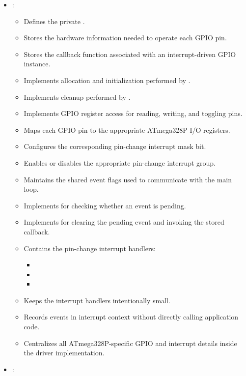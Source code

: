 \begin{itemize}
\begin{itemize}
  \end{itemize}
  \item {}:
  \begin{itemize}
    \item Defines the private .
    \item Stores the hardware information needed to operate each GPIO pin.
    \item Stores the callback function associated with an interrupt-driven GPIO instance.
    \item Implements allocation and initialization performed by .
    \item Implements cleanup performed by .
    \item Implements GPIO register access for reading, writing, and toggling pins.
    \item Maps each GPIO pin to the appropriate ATmega328P I/O registers.
    \item Configures the corresponding pin-change interrupt mask bit.
    \item Enables or disables the appropriate pin-change interrupt group.
    \item Maintains the shared event flags used to communicate with the main loop.
    \item Implements  for checking whether an event is pending.
    \item Implements  for clearing the pending event and invoking the
      stored callback.
    \item Contains the pin-change interrupt handlers:
    \begin{itemize}
      \item {}
      \item {}
      \item {}
    \end{itemize}
    \item Keeps the interrupt handlers intentionally small.
    \item Records events in interrupt context without directly calling application code.
    \item Centralizes all ATmega328P-specific GPIO and interrupt details inside the driver
      implementation.
  \end{itemize}
  \item {}:
  \begin{itemize}

\end{itemize}
\end{itemize}
